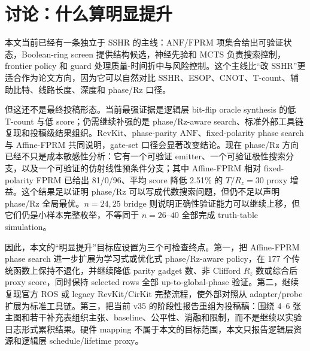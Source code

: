 \documentclass[UTF8,fontset=macnew,11pt]{ctexart}
\newcommand{\anf}{\ensuremath{\mathrm{ANF}}}
\newcommand{\fprm}{\ensuremath{\mathrm{FPRM}}}
\newcommand{\mcts}{\ensuremath{\mathrm{MCTS}}}
\newcommand{\rz}{\ensuremath{R_z}}
\begin{document}
\section{讨论：什么算明显提升}

本文当前已经有一条独立于 SSHR 的主线：\anf{}/\fprm{} 项集合给出可验证状态，Boolean-ring screen 提供结构候选，神经先验和 \mcts{} 负责搜索控制，frontier policy 和 guard 处理质量-时间折中与风险控制。这个主线比“改 SSHR”更适合作为论文方向，因为它可以自然对比 SSHR、ESOP、CNOT、T-count、辅助比特、线路长度、深度和 phase/Rz 口径。

但这还不是最终投稿形态。当前最强证据是逻辑层 bit-flip oracle synthesis 的低 T-count 与低 score；仍需继续补强的是 phase/Rz-aware search、标准外部工具链复现和投稿级结果组织。RevKit、phase-parity \anf{}、fixed-polarity phase search 与 Affine-FPRM 共同说明，gate-set 口径会显著改变结论。现在 phase/Rz 方向已经不只是成本敏感性分析：它有一个可验证 emitter、一个可验证极性搜索分支，以及一个可验证的仿射线性预条件分支；其中 Affine-FPRM 相对 fixed-polarity FPRM 已给出 81/0/96、平均 score 降低 2.51\% 的 $T/R_z=30$ proxy 增益。这个结果足以证明 phase/Rz 可以写成代数搜索问题，但仍不足以声明 phase/Rz 全局最优。$n=24,25$ bridge 则说明正确性验证能力可以继续上移，但它们仍是小样本完整枚举，不等同于 $n=26$--$40$ 全部完成 truth-table simulation。

因此，本文的“明显提升”目标应设置为三个可检查终点。第一，把 Affine-FPRM phase search 进一步扩展为学习式或优化式 phase/Rz-aware policy，在 177 个传统函数上保持不退化，并继续降低 parity gadget 数、非 Clifford \rz{} 数或综合后 proxy score，同时保持 selected rows 全部 up-to-global-phase 验证。第二，继续复现官方 ROS 或 legacy RevKit/CirKit 完整流程，使外部对照从 adapter/probe 扩展为标准工具链。第三，把当前 v35 的阶段性报告重组为投稿稿：围绕 4--6 张主图和若干补充表组织主张、baseline、公平性、消融和限制，而不是继续以实验日志形式累积结果。硬件 mapping 不属于本文的目标范围，本文只报告逻辑层资源和逻辑层 schedule/lifetime proxy。
\end{document}
